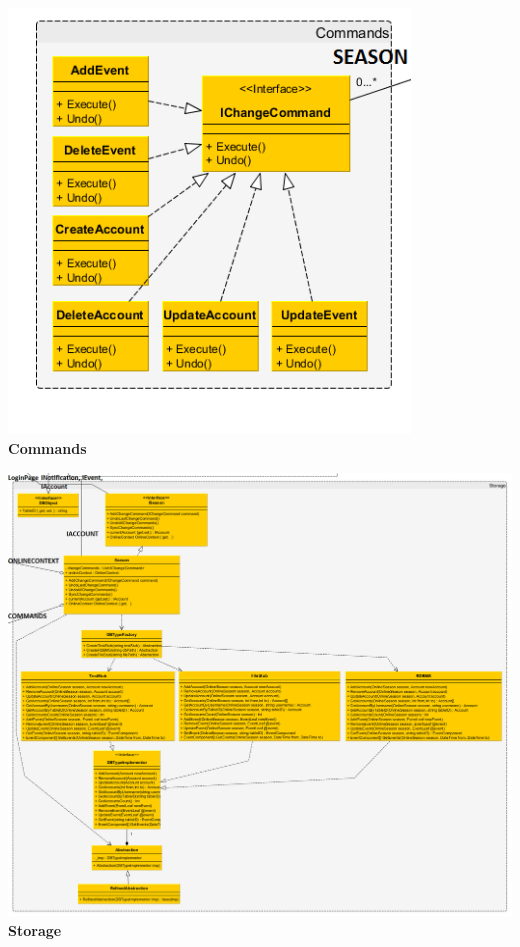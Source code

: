 \documentclass[a4paper]{article}
\begin{document}
\begin{table}
\centering
	\includegraphics[width=0.8\textwidth]{Commands.png}\\
\caption{\textbf{Commands}}
\end{table}

\begin{table}
\centering
	\includegraphics[width=1.3\textwidth]{Storage.png}\\
\caption{\textbf{Storage}}
\end{table}
\end{document}
